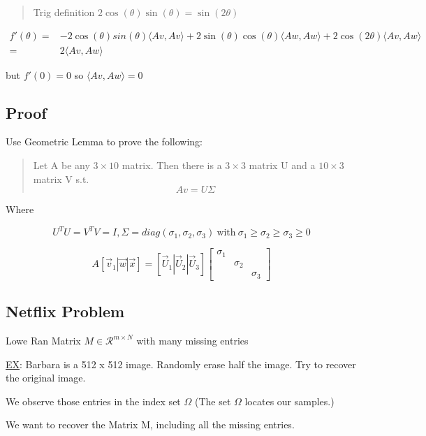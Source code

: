 \documentclass[11pt]{article}
\begin{document}
\begin{quote}
Trig definition
\(2 \cos(\theta) \sin(\theta) = \sin (2 \theta)\)
\end{quote}

\begin{equation}
\begin{split}
f' (\theta) = & -2 \cos (\theta) sin (\theta) \langle Av, Av \rangle + 2
\sin(\theta) \cos (\theta) \langle Aw, Aw \rangle + 2 \cos (2 \theta) \langle
Av, Aw \rangle\\
= & 2 \langle Av, Aw \rangle
\end{split}
\end{equation}


but \(f'(0) = 0\) so \(\langle Av, Aw \rangle = 0\)

\subsection{Proof}
\label{sec:orge2680cc}

Use Geometric Lemma to prove the following:

\begin{quote}
Let A be any \(3 \times 10\) matrix. Then there is a \(3 \times 3\) matrix U and a
\(10 \times 3\) matrix V s.t.
$$
Av = U \Sigma
$$
\end{quote}

Where

$$
U^T U = V^T V = I, \Sigma = diag(\sigma_1, \sigma_2, \sigma_3) \ \text{with} \
\sigma_1 \geq \sigma_2 \geq \sigma_3 \geq 0
$$

$$
A [\vec v_1 | \vec w | \vec x] = [\vec U_1 | \vec U_2 | \vec U_3] \begin{bmatrix}
\sigma_1 & & \\
& \sigma_2 &\\
& & \sigma_3
\end{bmatrix}
$$
\subsection{Netflix Problem}
\label{sec:orgdd16720}

Lowe Ran Matrix \(M \in \mathcal R^{m \times N}\) with many missing entries

\uline{EX}: Barbara is a 512 x 512 image. Randomly erase half the image. Try to
recover the original image.

We observe those entries in the index set \(\Omega\) (The set \(\Omega\) locates our
samples.)

We want to recover the Matrix M, including all the missing entries.
\end{document}
